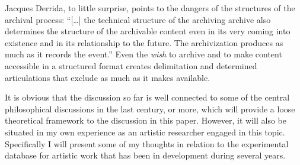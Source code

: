 \documentclass[12pt]{article}
\begin{document}
Jacques Derrida, to little surprise, points to the dangers of the structures of the archival process: ``[\ldots] the technical structure of the archiving archive also determines the structure of the archivable content even in its very coming into existence and in its relationship to the future. The archivization produces as much as it records the event.'' \citep[p. 17]{derrida1998} Even the \emph{wish} to archive and to make content accessible in a structured format creates delimitation and determined articulations that exclude as much as it makes available.

It is obvious that the discussion so far is well connected to some of the central philosophical discussions in the last century, or more, which will provide a loose theoretical framework to the discussion in this paper.
However, it will also be situated in my own experience as an artistic researcher engaged in this topic. Specifically I will present some of my thoughts in relation to the experimental database for artistic work that has been in development during several years.





\printbibliography
\end{document}
